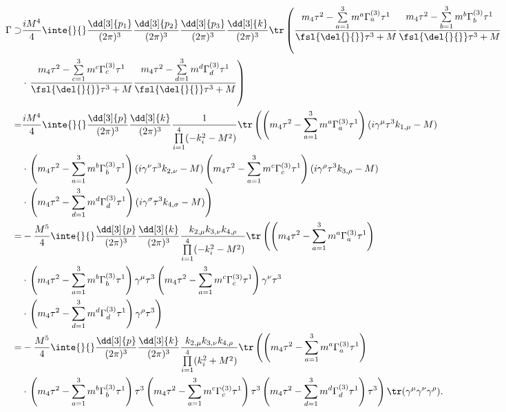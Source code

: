 \begin{align*}
	\Gamma \supset& \frac{iM^{4}}{4}\inte{}{}\frac{\dd[3]{p_{1}}}{(2\pi)^{3}}\frac{\dd[3]{p_{2}}}{(2\pi)^{3}}\frac{\dd[3]{p_{3}}}{(2\pi)^{3}}\frac{\dd[3]{k}}{(2\pi)^{3}}\tr\left(\frac{m_{4}\tau^{2} - \sum\limits_{a = 1}^{3}m^{a}\Gamma_{a}^{(3)}\tau^{1}}{\fsl{\del{}{}}\tau^{3} + M}\frac{m_{4}\tau^{2} - \sum\limits_{b = 1}^{3}m^{b}\Gamma_{b}^{(3)}\tau^{1}}{\fsl{\del{}{}}\tau^{3} + M} \right. \\
	 &\cdot \left. \frac{m_{4}\tau^{2} - \sum\limits_{c = 1}^{3}m^{c}\Gamma_{c}^{(3)}\tau^{1}}{\fsl{\del{}{}}\tau^{3} + M}\frac{m_{4}\tau^{2} - \sum\limits_{d = 1}^{3}m^{d}\Gamma_{d}^{(3)}\tau^{1}}{\fsl{\del{}{}}\tau^{3} + M}\right) \\
	=& \frac{iM^{4}}{4}\inte{}{}\frac{\dd[3]{p}}{(2\pi)^{3}}\frac{\dd[3]{k}}{(2\pi)^{3}}\frac{1}{\prod\limits_{i = 1}^{4}(-k_{i}^{2} - M^{2})}\tr\left(\left(m_{4}\tau^{2} - \sum\limits_{a = 1}^{3}m^{a}\Gamma_{a}^{(3)}\tau^{1}\right)(i\gamma^{\mu}\tau^{3}k_{1, \mu} - M) \right. \\
	 &\cdot \left. \left(m_{4}\tau^{2} - \sum\limits_{a = 1}^{3}m^{b}\Gamma_{b}^{(3)}\tau^{1}\right)(i\gamma^{\nu}\tau^{3}k_{2, \nu} - M)\left(m_{4}\tau^{2} - \sum\limits_{a = 1}^{3}m^{c}\Gamma_{c}^{(3)}\tau^{1}\right)(i\gamma^{\rho}\tau^{3}k_{3, \rho} - M) \right. \\
	 &\cdot \left. \left(m_{4}\tau^{2} - \sum\limits_{d = 1}^{3}m^{d}\Gamma_{d}^{(3)}\tau^{1}\right)(i\gamma^{\sigma}\tau^{3}k_{4, \sigma} - M)\right) \\
	=& -\frac{M^{5}}{4}\inte{}{}\frac{\dd[3]{p}}{(2\pi)^{3}}\frac{\dd[3]{k}}{(2\pi)^{3}}\frac{k_{2, \mu}k_{3, \nu}k_{4, \rho}}{\prod\limits_{i = 1}^{4}(-k_{i}^{2} - M^{2})}\tr\left(\left(m_{4}\tau^{2} - \sum\limits_{a = 1}^{3}m^{a}\Gamma_{a}^{(3)}\tau^{1}\right) \right. \\
	 &\cdot \left. \left(m_{4}\tau^{2} - \sum\limits_{a = 1}^{3}m^{b}\Gamma_{b}^{(3)}\tau^{1}\right)\gamma^{\mu}\tau^{3}\left(m_{4}\tau^{2} - \sum\limits_{a = 1}^{3}m^{c}\Gamma_{c}^{(3)}\tau^{1}\right)\gamma^{\nu}\tau^{3} \right. \\
	 &\cdot \left. \left(m_{4}\tau^{2} - \sum\limits_{d = 1}^{3}m^{d}\Gamma_{d}^{(3)}\tau^{1}\right)\gamma^{\rho}\tau^{3}\right) \\
	=& -\frac{M^{5}}{4}\inte{}{}\frac{\dd[3]{p}}{(2\pi)^{3}}\frac{\dd[3]{k}}{(2\pi)^{3}}\frac{k_{2, \mu}k_{3, \nu}k_{4, \rho}}{\prod\limits_{i = 1}^{4}(k_{i}^{2} + M^{2})}\tr\left(\left(m_{4}\tau^{2} - \sum\limits_{a = 1}^{3}m^{a}\Gamma_{a}^{(3)}\tau^{1}\right) \right. \\
	 &\cdot \left. \left(m_{4}\tau^{2} - \sum\limits_{a = 1}^{3}m^{b}\Gamma_{b}^{(3)}\tau^{1}\right)\tau^{3}\left(m_{4}\tau^{2} - \sum\limits_{a = 1}^{3}m^{c}\Gamma_{c}^{(3)}\tau^{1}\right)\tau^{3}\left(m_{4}\tau^{2} - \sum\limits_{d = 1}^{3}m^{d}\Gamma_{d}^{(3)}\tau^{1}\right)\tau^{3}\right)\tr(\gamma^{\mu}\gamma^{\nu}\gamma^{\rho}).
\end{align*}
